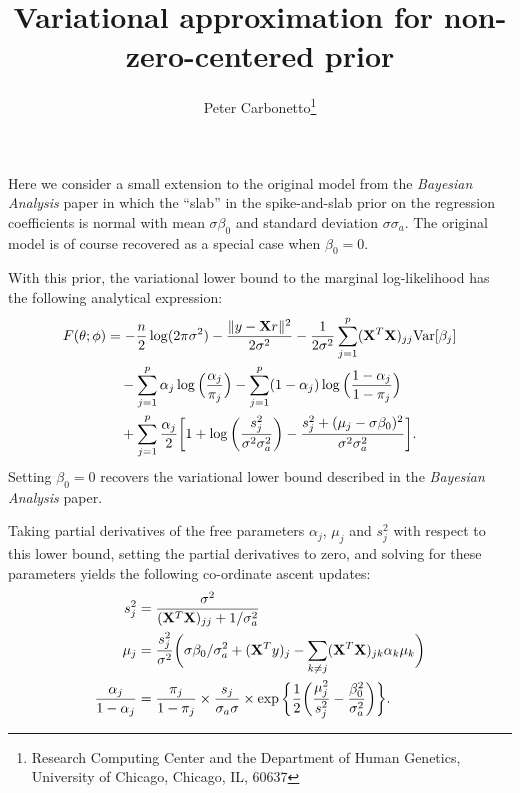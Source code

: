 \documentclass[final]{siamltex}
\title{Variational approximation for non-zero-centered prior}
\author{Peter Carbonetto\thanks{Research Computing Center and the
    Department of Human Genetics, University of Chicago, Chicago, IL,
    60637}}
\begin{document}
\maketitle

\noindent Here we consider a small extension to the original model
from the {\em Bayesian Analysis} paper in which the ``slab'' in the
spike-and-slab prior on the regression coefficients is normal with
mean $\sigma \beta_0$ and standard deviation $\sigma \sigma_a$. The
original model is of course recovered as a special case when $\beta_0
= 0$.

With this prior, the variational lower bound to the marginal
log-likelihood has the following analytical expression:
\begin{align}
F(\theta; \phi) &=
 - \frac{n}{2}\log(2\pi\sigma^2)
- \frac{\|y - {\bf X}r\|^2}{2\sigma^2} 
- \frac{1}{2\sigma^2} \sum_{j=1}^p ({\bf X}^T{\bf X})_{jj}
  \mathrm{Var}[\beta_j]
  \nonumber \\
&\quad - \sum_{j=1}^p \alpha_j \log\Big(\frac{\alpha_j}{\pi_j}\Big)
       - \sum_{j=1}^p (1-\alpha_j) \log\Big(\frac{1-\alpha_j}{1-\pi_j}\Big)
  \nonumber \\
&\quad + \sum_{j=1}^p \frac{\alpha_j}{2} \bigg[
1 + \log\bigg(\frac{s_j^2}{\sigma^2 \sigma_a^2}\bigg)
  - \frac{s_j^2 + (\mu_j - \sigma\beta_0)^2}{\sigma^2\sigma_a^2} \bigg].
\end{align}
Setting $\beta_0 = 0$ recovers the variational lower bound described
in the {\em Bayesian Analysis} paper.

Taking partial derivatives of the free parameters $\alpha_j$, $\mu_j$
and $s_j^2$ with respect to this lower bound, setting the partial
derivatives to zero, and solving for these parameters yields the
following co-ordinate ascent updates:
\begin{align}
s_j^2 &= \frac{\sigma^2}{({\bf X}^T{\bf X})_{jj} + 1/\sigma_a^2} \\
\mu_j &= \frac{s_j^2}{\sigma^2} \bigg(\sigma \beta_0/\sigma_a^2 +
  ({\bf X}^Ty)_j - \sum_{k \neq j}
  ({\bf X}^T{\bf X})_{jk} \alpha_k \mu_k \bigg) \\
\frac{\alpha_j}{1-\alpha_j} &= \frac{\pi_j}{1-\pi_j} \times 
  \frac{s_j}{\sigma_a\sigma} \times
  \exp\bigg\{\frac{1}{2}\bigg(\frac{\mu_j^2}{s_j^2}
           - \frac{\beta_0^2}{\sigma_a^2}\bigg)\bigg\}.
\end{align}
\end{document}
